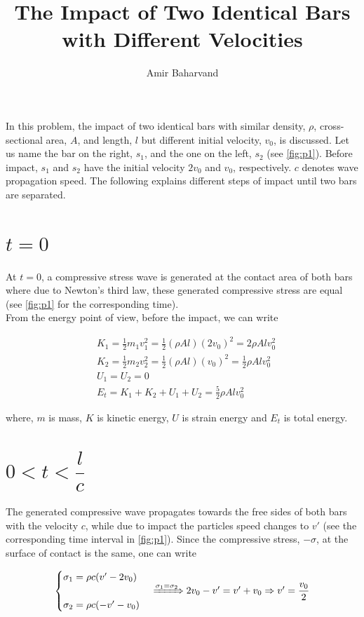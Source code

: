 \documentclass{article}
\title{The Impact of Two Identical Bars with Different Velocities}
\author{Amir Baharvand }
\date{}
\begin{document}
\maketitle

In this problem, the impact of two identical bars with similar density, $\rho$, cross-sectional area, $A$, and length, $l$ but different initial velocity, $v_0$, is discussed. Let us name the bar on the right, $s_1$, and the one on the left, $s_2$ (see \cref{fig:p1}). Before impact, $s_1$ and $s_2$ have the initial velocity $2v_0$ and $v_0$, respectively. $c$ denotes wave propagation speed. The following explains different steps of impact until two bars are separated.

\section{$t = 0$}
At $t = 0$, a compressive stress wave is generated at the contact area of both bars where due to Newton's third law, these generated compressive stress are equal (see \cref{fig:p1} for the corresponding time). \\

From the energy point of view, before the impact, we can write

\begin{align*}
    & K_1 = \frac{1}{2} m_1 v_1^2 = \frac{1}{2} (\rho A l) (2v_0)^2 = 2 \rho A l v_0^2 \\
    & K_2 = \frac{1}{2} m_2 v_2^2 = \frac{1}{2} (\rho A l) (v_0)^2 = \frac{1}{2} \rho A l v_0^2 \\
    & U_1 = U_2 = 0 \\
    & E_t = K_1 + K_2 + U_1 + U_2 = \frac{5}{2} \rho A l v_0^2
\end{align*}

where, $m$ is mass, $K$ is kinetic energy, $U$ is strain energy and $E_t$ is total energy.

\section{$0 < t < \dfrac{l}{c}$}
The generated compressive wave propagates towards the free sides of both bars with the velocity $c$, while due to impact the particles speed changes to $v'$ (see the corresponding time interval in \cref{fig:p1}). Since the compressive stress, $-\sigma$, at the surface of contact is the same, one can write 

\begin{equation*}
\begin{matrix}
    \begin{cases}
        \sigma_1 = \rho c (v' - 2v_0) \\
        \\
        \sigma_2 = \rho c (-v' - v_0) \\
    \end{cases}
    \xRightarrow[]{\sigma_1 = \sigma_2}
    2v_0 - v' = v' + v_0 \Rightarrow v' = \dfrac{v_0}{2}
\end{matrix}
\end{equation*}
\end{document}
